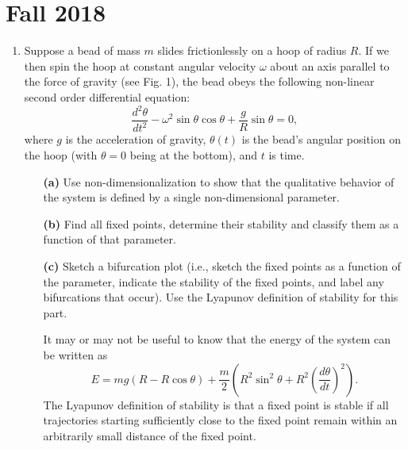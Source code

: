 \documentclass[10pt,letterpaper]{report}
\renewcommand{\chaptermark}[1]{%
\markboth{#1}{}}
\begin{document}
\chapter*{Fall 2018}
\chaptermark{Fall 2018}

\begin{enumerate}

\item 
\begin{qbox}
Suppose a bead of mass $m$ slides frictionlessly on a hoop of radius $R$. If we then spin the hoop at constant angular velocity $\omega$ about an axis parallel to the force of gravity (see Fig. 1), the bead obeys the following non-linear second order differential equation:
\[
\frac{d^2\theta}{dt^2} - \omega^2 \sin\theta \cos\theta + \frac{g}{R}\sin\theta = 0,
\]
where $g$ is the acceleration of gravity, $\theta(t)$ is the bead's angular position on the hoop (with
$\theta = 0$ being at the bottom), and $t$ is time.

\begin{itemize}
    \item[\textbf{(a)}] Use non-dimensionalization to show that the qualitative behavior of the system is defined by a single non-dimensional parameter.
    
    \item[\textbf{(b)}] Find all fixed points, determine their stability and classify them as a function of that parameter.
    
    \item[\textbf{(c)}] Sketch a bifurcation plot (i.e., sketch the fixed points as a function of the parameter, indicate the stability of the fixed points, and label any bifurcations that occur). Use the Lyapunov definition of stability for this part.
    
    It may or may not be useful to know that the energy of the system can be written as
    \[
    E = mg (R - R\cos\theta) + \frac{m}{2}\left(R^2 \sin^2\theta + R^2 \left(\frac{d\theta}{dt}\right)^2\right).
    \]
    The Lyapunov definition of stability is that a fixed point is stable if all trajectories starting sufficiently close to the fixed point remain within an arbitrarily small distance of the fixed point.
\end{itemize}
\end{qbox}


\end{enumerate}
\end{document}
